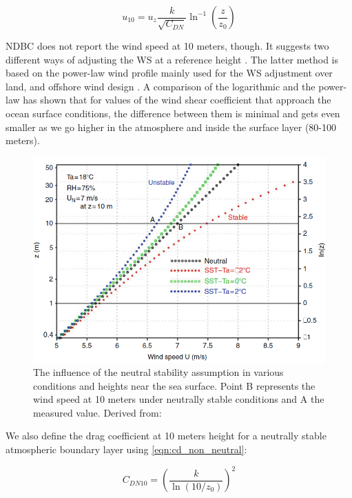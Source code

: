 \begin{equation}
u_{10} = u_{z} \frac{k}{\sqrt{C_{DN}}} \ln^{-1}\left({\frac{z}{z_{0}}}\right)
\label{eqn:u10}
\end{equation}

NDBC does not report the wind speed at 10 meters, though. It suggests two different ways of adjusting the WS at a reference height \cite{Hsu1994a, Liu1979}. The latter method is based on the power-law wind profile mainly used for the WS adjustment over land, and offshore wind design \cite{Commision2019}. A comparison of the logarithmic and the power-law \cite{Emeis2013} has shown that for values of the wind shear coefficient that approach the ocean surface conditions, the difference between them is minimal and gets even smaller as we go higher in the atmosphere and inside the surface layer (80-100 meters). 
 
\begin{figure}[H]
\centering
\includegraphics[width=0.75\linewidth]{Figures/Chapter2/stability.png}
\caption{The influence of the neutral stability assumption in various conditions and heights near the sea surface. Point B represents the wind speed at 10 meters under neutrally stable conditions and A the measured value. Derived from: \cite{Liu2014}}
\label{fig:stability}
\end{figure}

We also define the drag coefficient at 10 meters height for a neutrally stable atmospheric boundary layer using \ref{eqn:cd_non_neutral}:


\begin{equation}
C_{DN10} = \left( \frac{k}{\ln{\left( 10/z_{0} \right)}} \right)^2
\label{eqn:cd_neutral}
\end{equation}

